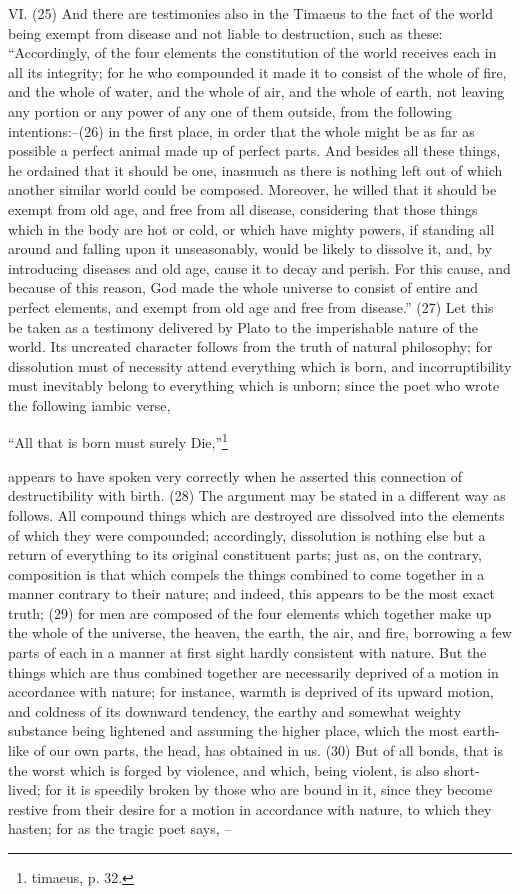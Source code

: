 VI. (25) And there are testimonies also in the Timaeus to the fact of the world being exempt from
disease and not liable to destruction, such as these: ``Accordingly, of the four elements the
constitution of the world receives each in all its integrity; for he who compounded it made it to
consist of the whole of fire, and the whole of water, and the whole of air, and the whole of earth, not
leaving any portion or any power of any one of them outside, from the following intentions:--(26) in
the first place, in order that the whole might be as far as possible a perfect animal made up of
perfect parts. And besides all these things, he ordained that it should be one, inasmuch as there is
nothing left out of which another similar world could be composed. Moreover, he willed that it should
be exempt from old age, and free from all disease, considering that those things which in the body
are hot or cold, or which have mighty powers, if standing all around and falling upon it
unseasonably, would be likely to dissolve it, and, by introducing diseases and old age, cause it to
decay and perish. For this cause, and because of this reason, God made the whole universe to
consist of entire and perfect elements, and exempt from old age and free from disease.'' (27) Let
this be taken as a testimony delivered by Plato to the imperishable nature of the world. Its
uncreated character follows from the truth of natural philosophy; for dissolution must of necessity
attend everything which is born, and incorruptibility must inevitably belong to everything which is
unborn; since the poet who wrote the following iambic verse,

``All that is born must surely Die,''\footnote{timaeus, p. 32.}

appears to have spoken very correctly when he asserted this connection of destructibility with
birth. (28) The argument may be stated in a different way as follows. All compound things which are
destroyed are dissolved into the elements of which they were compounded; accordingly,
dissolution is nothing else but a return of everything to its original constituent parts; just as, on the
contrary, composition is that which compels the things combined to come together in a manner
contrary to their nature; and indeed, this appears to be the most exact truth; (29) for men are
composed of the four elements which together make up the whole of the universe, the heaven, the
earth, the air, and fire, borrowing a few parts of each in a manner at first sight hardly consistent
with nature. But the things which are thus combined together are necessarily deprived of a motion
in accordance with nature; for instance, warmth is deprived of its upward motion, and coldness of
its downward tendency, the earthy and somewhat weighty substance being lightened and assuming
the higher place, which the most earth-like of our own parts, the head, has obtained in us. (30) But
of all bonds, that is the worst which is forged by violence, and which, being violent, is also
short-lived; for it is speedily broken by those who are bound in it, since they become restive from
their desire for a motion in accordance with nature, to which they hasten; for as the tragic poet
says, --

